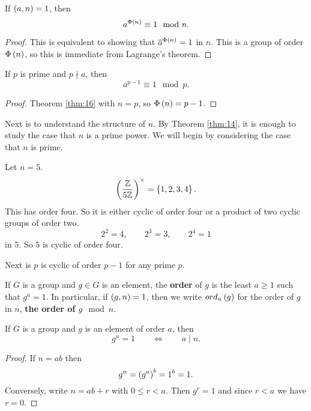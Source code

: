 \begin{theorem}
\label{thm:16}
If $ \left( a, n \right) = 1 $, then
$$ a^{\Phi\left( n \right)} \equiv 1 \mod n. $$
\end{theorem}

\begin{proof}
This is equivalent to showing that $ \overline{a}^{\Phi\left( n \right)} = 1 $ in $ \unit{n} $. This is a group of order $ \Phi\left( n \right) $, so this is immediate from Lagrange's theorem.
\end{proof}

\begin{corollary}
If $ p $ is prime and $ p \nmid a $, then
$$ a^{p - 1} \equiv 1 \mod p. $$
\end{corollary}

\begin{proof}
Theorem \ref{thm:16} with $ n = p $, so $ \Phi\left( n \right) = p - 1 $.
\end{proof}

Next is to understand the structure of $ \unit{n} $. By Theorem \ref{thm:14}, it is enough to study the case that $ n $ is a prime power. We will begin by considering the case that $ n $ is prime.

\begin{example*}
Let $ n = 5 $.
$$ \left( \dfrac{\mathbb{Z}}{5\mathbb{Z}} \right)^\times = \left\{ 1, 2, 3, 4 \right\}. $$
This has order four. So it is either cyclic of order four or a product of two cyclic groups of order two.
$$ 2^2 = 4, \qquad 2^3 = 3, \qquad 2^4 = 1 $$
in $ \unit{5} $. So $ \unit{5} $ is cyclic of order four.
\end{example*}

Next is $ \unit{p} $ is cyclic of order $ p - 1 $ for any prime $ p $.


\begin{definition}
If $ G $ is a group and $ g \in G $ is an element, the \textbf{order} of $ g $ is the least $ a \ge 1 $ such that $ g^a = 1 $. In particular, if $ \left( g, n \right) = 1 $, then we write $ ord_n\left( g \right) $ for the order of $ g $ in $ \unit{n} $, \textbf{the order of $ g \mod n $}.
\end{definition}

\begin{proposition}
\label{prop:19}
If $ G $ is a group and $ g $ is an element of order $ a $, then
$$ g^n = 1 \qquad \iff \qquad a \mid n. $$
\end{proposition}

\begin{proof}
If $ n = ab $ then
$$ g^n = \left( g^a \right)^b = 1^b = 1. $$
Conversely, write $ n = ab + r $ with $ 0 \le r < a $. Then $ g^r = 1 $ and since $ r < a $ we have $ r = 0 $.
\end{proof}

